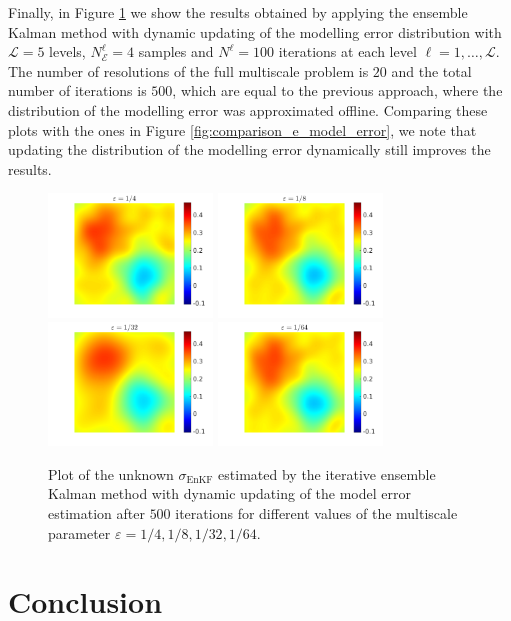 \documentclass[10pt]{article}
\begin{document}
Finally, in Figure \ref{fig:comparison_e_model_error_levels} we show the results obtained by applying the ensemble Kalman method with dynamic updating of the modelling error distribution with $\mathcal{L} = 5$ levels, $N_{\mathcal{E}}^{\ell} = 4$ samples and $N^{\ell} = 100$ iterations at each level $\ell = 1, \dots, \mathcal{L}$. The number of resolutions of the full multiscale problem is $20$ and the total number of iterations is $500$, which are equal to the previous approach, where the distribution of the modelling error was approximated offline. Comparing these plots with the ones in Figure \ref{fig:comparison_e_model_error}, we note that updating the distribution of the modelling error dynamically still improves the results.

\begin{figure}[t]
\centering
\includegraphics[width = 0.39\textwidth]{figures/ensemble_500_e4_model_error_Levels}
\includegraphics[width = 0.39\textwidth]{figures/ensemble_500_e8_model_error_Levels}
\\
\includegraphics[width = 0.39\textwidth]{figures/ensemble_500_e32_model_error_Levels}
\includegraphics[width = 0.39\textwidth]{figures/ensemble_500_e64_model_error_Levels}
\caption{Plot of the unknown $\sigma_{\mathrm{EnKF}}$ estimated by the iterative ensemble Kalman method with dynamic updating of the model error estimation after $500$ iterations for different values of the multiscale parameter $\varepsilon = 1/4, 1/8, 1/32, 1/64$.}
\label{fig:comparison_e_model_error_levels}
\end{figure}

\section*{Conclusion}


\clearpage





\end{document}
